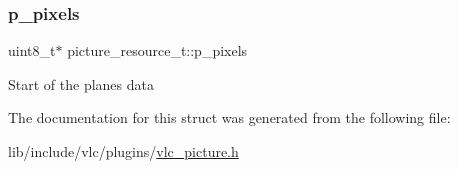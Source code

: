 \subsubsection{\texorpdfstring{p\+\_\+pixels}{p\_pixels}}
{\footnotesize\ttfamily uint8\+\_\+t$\ast$ picture\+\_\+resource\+\_\+t\+::p\+\_\+pixels}

Start of the plane\textquotesingle{}s data 

The documentation for this struct was generated from the following file\+:\begin{DoxyCompactItemize}
\item 
lib/include/vlc/plugins/\hyperlink{vlc__picture_8h}{vlc\+\_\+picture.\+h}\end{DoxyCompactItemize}
